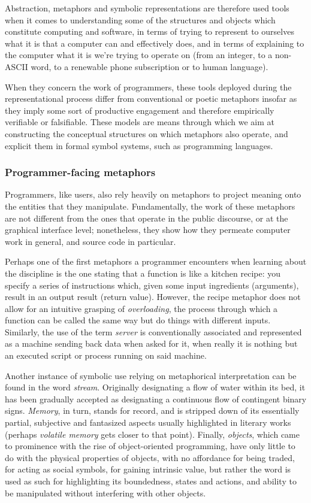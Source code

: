 Abstraction, metaphors and symbolic representations are therefore used tools when it comes to understanding some of the structures and objects which constitute computing and software, in terms of trying to represent to ourselves what it is that a computer can and effectively does, and in terms of explaining to the computer what it is we're trying to operate on (from an integer, to a non-ASCII word, to a renewable phone subscription or to human language). 

When they concern the work of programmers, these tools deployed during the representational process differ from conventional or poetic metaphors insofar as they imply some sort of productive engagement and therefore empirically verifiable or falsifiable. These models are means through which we aim at constructing the conceptual structures on which metaphors also operate, and explicit them in formal symbol systems, such as programming languages.

\subsubsection{Programmer-facing metaphors}
\label{subsubsec:metaphors-programmers}

Programmers, like users, also rely heavily on metaphors to project meaning onto the entities that they manipulate. Fundamentally, the work of these metaphors are not different from the ones that operate in the public discourse, or at the graphical interface level; nonetheless, they show how they permeate computer work in general, and source code in particular.

Perhaps one of the first metaphors a programmer encounters when learning about the discipline is the one stating that a function is like a kitchen recipe: you specify a series of instructions which, given some input ingredients (arguments), result in an output result (return value). However, the recipe metaphor does not allow for an intuitive grasping of \emph{overloading}, the process through which a function can be called the same way but do things with different inputs. Similarly, the use of the term \emph{server} is conventionally associated and represented as a machine sending back data when asked for it, when really it is nothing but an executed script or process running on said machine.

Another instance of symbolic use relying on metaphorical interpretation can be found in the word \emph{stream}. Originally designating a flow of water within its bed, it has been gradually accepted as designating a continuous flow of contingent binary signs. \emph{Memory}, in turn, stands for record, and is stripped down of its essentially partial, subjective and fantasized aspects usually highlighted in literary works (perhaps \emph{volatile memory} gets closer to that point). Finally, \emph{objects}, which came to prominence with the rise of object-oriented programming, have only little to do with the physical properties of objects, with no affordance for being traded, for acting as social symbols, for gaining intrinsic value, but rather the word is used as such for highlighting its boundedness, states and actions, and ability to be manipulated without interfering with other objects.

